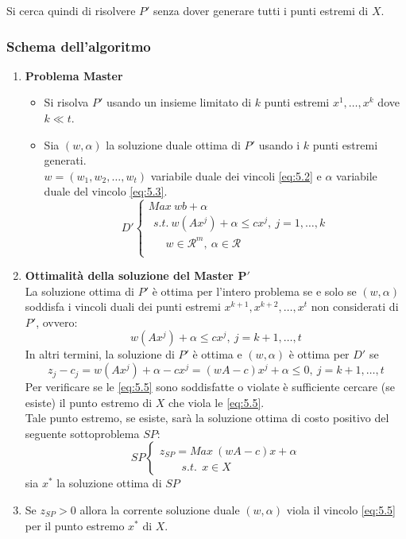 Si cerca quindi di risolvere $P'$ senza dover generare tutti i punti estremi di $X$.

\clearpage
\subsubsection{Schema dell'algoritmo}
\begin{enumerate}
	\item \textbf{Problema Master}
		\begin{itemize}
			\item Si risolva $P'$ usando un insieme limitato di $k$ punti estremi $x^{1},\dots,x^{k}$ dove $k\ll t$.
			\item Sia $(w,\alpha)$ la soluzione duale ottima di $P'$ usando i $k$ punti estremi generati.\\
			$w=(w_{1},w_{2},\dots,w_{t})$ variabile duale dei vincoli \ref{eq:5.2} e $\alpha$ variabile duale del vincolo \ref{eq:5.3}.
			\begin{equation*}
				D'
				\begin{cases}
					Max\ w b+\alpha \\
					\ \ s.t.\ w(Ax^{j})+\alpha\le cx^{j},\ j=1,\dots,k \\
					\ \ \ \ \ \ \ w\in\mathscr{R}^{m},\ \alpha\in\mathscr{R} \\
				\end{cases}
			\end{equation*}
		\end{itemize}
	\item \textbf{Ottimalità della soluzione del Master $\boldsymbol{P'}$}\\
	La soluzione ottima di $P'$ è ottima per l'intero problema se e solo se $(w,\alpha)$ soddisfa i vincoli duali dei punti estremi $x^{k+1},x^{k+2},\dots,x^{t}$ non considerati di $P'$, ovvero:
	\begin{equation*}
		w(Ax^{j})+\alpha\le cx^{j},\ j=k+1,\dots,t
	\end{equation*}
	In altri termini, la soluzione di $P'$ è ottima e $(w,\alpha)$ è ottima per $D'$ se
	\begin{equation}
		z_{j}-c_{j}=w(Ax^{j})+\alpha-cx^{j}=(w A-c)x^{j}+\alpha\le 0,\ j=k+1,\dots,t \label{eq:5.5}
	\end{equation}
	Per verificare se le \ref{eq:5.5} sono soddisfatte o violate è sufficiente cercare (se esiste) il punto estremo di $X$ che viola le \ref{eq:5.5}.\\
	Tale punto estremo, se esiste, sarà la soluzione ottima di costo positivo del seguente sottoproblema $SP$:
	\begin{equation*}
		SP
		\begin{cases}
			z_{SP}=Max\ (w A-c)x+\alpha \\
			\ \ \ \ \ \ \ \ \ s.t.\ \ x\in X
		\end{cases}
	\end{equation*}
	sia $x^{*}$ la soluzione ottima di $SP$
	\item Se $z_{SP}>0$ allora la corrente soluzione duale $(w,\alpha)$ viola il vincolo \ref{eq:5.5} per il punto estremo $x^{*}$ di $X$.
	

\end{enumerate}
